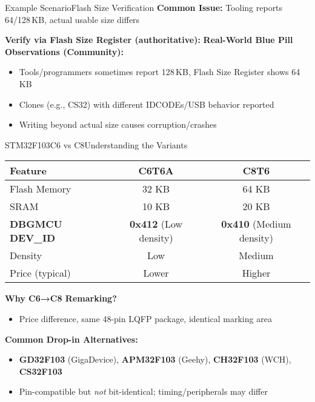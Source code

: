 \documentclass{beamer}
\begin{document}
\begin{frame}[fragile]{Example Scenario}{Flash Size Verification}
	\textbf{Common Issue:} Tooling reports 64/128\,KB, actual usable size differs
	
	\smallskip
	\textbf{Verify via Flash Size Register (authoritative):}
	\textbf{Real-World Blue Pill Observations (Community):}
	\begin{itemize}
		\item Tools/programmers sometimes report 128\,KB, Flash Size Register shows 64\,KB
		\item Clones (e.g., CS32) with different IDCODEs/USB behavior reported
		\item Writing beyond actual size causes corruption/crashes
	\end{itemize}
\end{frame}
\begin{frame}{STM32F103C6 vs C8}{Understanding the Variants}
	\begin{center}
		\small
		\begin{tabular}{|l|c|c|}
			\hline
			\textbf{Feature} & \textbf{C6T6A} & \textbf{C8T6} \\ \hline
			Flash Memory & 32 KB & 64 KB \\ \hline
			SRAM & 10 KB & 20 KB \\ \hline
			\textbf{DBGMCU DEV\_ID} & \textbf{0x412} (Low density) & \textbf{0x410} (Medium density) \\ \hline
			Density & Low & Medium \\ \hline
			Price (typical) & Lower & Higher \\ \hline
		\end{tabular}
	\end{center}

	\medskip
	\textbf{Why C6→C8 Remarking?}
	\begin{itemize}
		\item Price difference, same 48-pin LQFP package, identical marking area
	\end{itemize}
	
	\medskip
	\textbf{Common Drop-in Alternatives:}
	\begin{itemize}
		\item \textbf{GD32F103} (GigaDevice), \textbf{APM32F103} (Geehy), \textbf{CH32F103} (WCH), \textbf{CS32F103}
		\item Pin-compatible but \emph{not} bit-identical; timing/peripherals may differ
	\end{itemize}
\end{frame}
\end{document}
